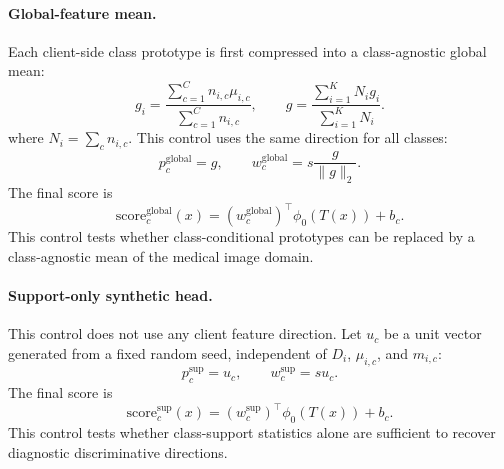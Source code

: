 \documentclass[letterpaper]{article}
\begin{document}
\paragraph{Global-feature mean.}
Each client-side class prototype is first compressed into a class-agnostic global mean:
\begin{equation}
g_i=\frac{\sum_{c=1}^{C}n_{i,c}\mu_{i,c}}{\sum_{c=1}^{C}n_{i,c}},
\qquad
g=\frac{\sum_{i=1}^{K}N_i g_i}{\sum_{i=1}^{K}N_i}.
\end{equation}
where $N_i=\sum_c n_{i,c}$. This control uses the same direction for all classes:
\begin{equation}
p_c^{\mathrm{global}}=g,
\qquad
w_c^{\mathrm{global}}=s\frac{g}{\|g\|_2}.
\end{equation}
The final score is
\begin{equation}
\mathrm{score}_c^{\mathrm{global}}(x)
=\left(w_c^{\mathrm{global}}\right)^\top\phi_0(T(x))+b_c.
\end{equation}
This control tests whether class-conditional prototypes can be replaced by a class-agnostic mean of the medical image domain.

\paragraph{Support-only synthetic head.}
This control does not use any client feature direction. Let $u_c$ be a unit vector generated from a fixed random seed, independent of $D_i$, $\mu_{i,c}$, and $m_{i,c}$:
\begin{equation}
p_c^{\mathrm{sup}}=u_c,
\qquad
w_c^{\mathrm{sup}}=s u_c.
\end{equation}
The final score is
\begin{equation}
\mathrm{score}_c^{\mathrm{sup}}(x)
=\left(w_c^{\mathrm{sup}}\right)^\top\phi_0(T(x))+b_c.
\end{equation}
This control tests whether class-support statistics alone are sufficient to recover diagnostic discriminative directions.
\end{document}
